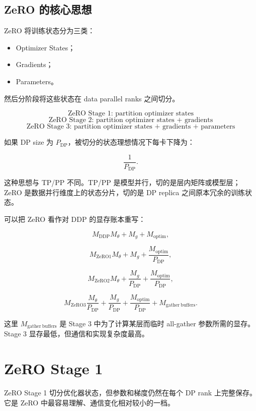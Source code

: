 \subsection{ZeRO 的核心思想}
\label{subsec:zero-core-idea}

ZeRO 将训练状态分为三类：

\begin{itemize}
\item Optimizer States；
\item Gradients；
\item Parameters。
\end{itemize}

然后分阶段将这些状态在 data parallel ranks 之间切分。

\[
\text{ZeRO Stage 1: partition optimizer states}
\]
\[
\text{ZeRO Stage 2: partition optimizer states + gradients}
\]
\[
\text{ZeRO Stage 3: partition optimizer states + gradients + parameters}
\]

如果 DP size 为 $P_{\mathrm{DP}}$，被切分的状态理想情况下每卡下降为：

\[
\frac{1}{P_{\mathrm{DP}}}.
\]

这种思想与 TP/PP 不同。TP/PP 是模型并行，切的是层内矩阵或模型层；ZeRO 是数据并行维度上的状态分片，切的是 DP replica 之间原本冗余的训练状态。

可以把 ZeRO 看作对 DDP 的显存账本重写：

\[
M_{\mathrm{DDP}}
M_{\theta}
+
M_g
+
M_{\mathrm{optim}},
\]

\[
M_{\mathrm{ZeRO1}}
M_{\theta}
+
M_g
+
\frac{M_{\mathrm{optim}}}{P_{\mathrm{DP}}},
\]

\[
M_{\mathrm{ZeRO2}}
M_{\theta}
+
\frac{M_g}{P_{\mathrm{DP}}}
+
\frac{M_{\mathrm{optim}}}{P_{\mathrm{DP}}},
\]

\[
M_{\mathrm{ZeRO3}}
\frac{M_{\theta}}{P_{\mathrm{DP}}}
+
\frac{M_g}{P_{\mathrm{DP}}}
+
\frac{M_{\mathrm{optim}}}{P_{\mathrm{DP}}}
+
M_{\mathrm{gather\ buffers}}.
\]

这里 $M_{\mathrm{gather\ buffers}}$ 是 Stage 3 中为了计算某层而临时 all-gather 参数所需的显存。Stage 3 显存最低，但通信和实现复杂度最高。

\section{ZeRO Stage 1}
\label{sec:zero-stage1}

ZeRO Stage 1 切分优化器状态，但参数和梯度仍然在每个 DP rank 上完整保存。它是 ZeRO 中最容易理解、通信变化相对较小的一档。

